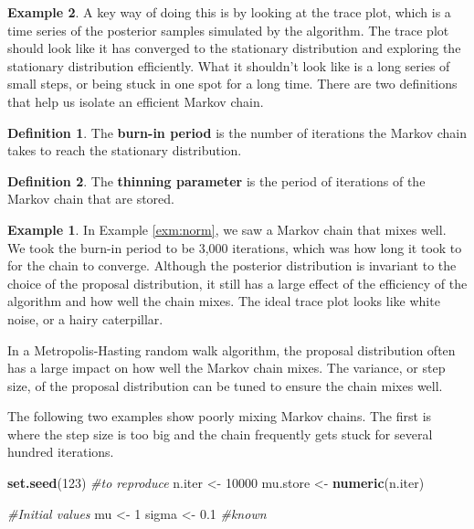 \documentclass[
]{book}
\newenvironment{Shaded}{\begin{snugshade}}{\end{snugshade}}
\newcommand{\CommentTok}[1]{\textcolor[rgb]{0.56,0.35,0.01}{\textit{#1}}}
\newcommand{\DecValTok}[1]{\textcolor[rgb]{0.00,0.00,0.81}{#1}}
\newcommand{\FloatTok}[1]{\textcolor[rgb]{0.00,0.00,0.81}{#1}}
\newcommand{\FunctionTok}[1]{\textcolor[rgb]{0.13,0.29,0.53}{\textbf{#1}}}
\newcommand{\NormalTok}[1]{#1}
\newcommand{\OtherTok}[1]{\textcolor[rgb]{0.56,0.35,0.01}{#1}}
\theoremstyle{definition}
\newtheorem{definition}{Definition}[chapter]
\theoremstyle{definition}
\newtheorem{example}{Example}[chapter]
\theoremstyle{definition}
\theoremstyle{definition}
\theoremstyle{remark}
\begin{document}
\begin{example}
A key way of doing this is by looking at the trace plot, which is a time series of the posterior samples simulated by the algorithm. The trace plot should look like it has converged to the stationary distribution and exploring the stationary distribution efficiently. What it shouldn't look like is a long series of small steps, or being stuck in one spot for a long time. There are two definitions that help us isolate an efficient Markov chain.

\begin{definition}
The \textbf{burn-in period} is the number of iterations the Markov chain takes to reach the stationary distribution.
\end{definition}

\begin{definition}
The \textbf{thinning parameter} is the period of iterations of the Markov chain that are stored.
\end{definition}

\begin{example}
In Example \ref{exm:norm}, we saw a Markov chain that mixes well. We took the burn-in period to be 3,000 iterations, which was how long it took to for the chain to converge. Although the posterior distribution is invariant to the choice of the proposal distribution, it still has a large effect of the efficiency of the algorithm and how well the chain mixes. The ideal trace plot looks like white noise, or a hairy caterpillar.

In a Metropolis-Hasting random walk algorithm, the proposal distribution often has a large impact on how well the Markov chain mixes. The variance, or step size, of the proposal distribution can be tuned to ensure the chain mixes well.

The following two examples show poorly mixing Markov chains. The first is where the step size is too big and the chain frequently gets stuck for several hundred iterations.

\begin{Shaded}
\begin{Highlighting}[]
\FunctionTok{set.seed}\NormalTok{(}\DecValTok{123}\NormalTok{) }\CommentTok{\#to reproduce}
\NormalTok{n.iter   }\OtherTok{\textless{}{-}} \DecValTok{10000}
\NormalTok{mu.store }\OtherTok{\textless{}{-}} \FunctionTok{numeric}\NormalTok{(n.iter)}

\CommentTok{\#Initial values}
\NormalTok{mu }\OtherTok{\textless{}{-}} \DecValTok{1} 
\NormalTok{sigma }\OtherTok{\textless{}{-}} \FloatTok{0.1} \CommentTok{\#known}


\end{Highlighting}
\end{Shaded}
\end{example}
\end{example}
\end{document}
